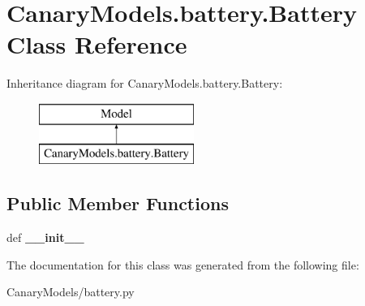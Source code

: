 \hypertarget{class_canary_models_1_1battery_1_1_battery}{\section{Canary\-Models.\-battery.\-Battery Class Reference}
\label{class_canary_models_1_1battery_1_1_battery}
}
Inheritance diagram for Canary\-Models.\-battery.\-Battery\-:\begin{figure}[H]
\begin{center}
\leavevmode
\includegraphics[height=2.000000cm]{class_canary_models_1_1battery_1_1_battery}
\end{center}
\end{figure}
\subsection*{Public Member Functions}
\begin{DoxyCompactItemize}
\item 
\hypertarget{class_canary_models_1_1battery_1_1_battery_a6c16d21f84b24adf291383af45f24b54}{def {\bfseries \-\_\-\-\_\-init\-\_\-\-\_\-}}\label{class_canary_models_1_1battery_1_1_battery_a6c16d21f84b24adf291383af45f24b54}

\end{DoxyCompactItemize}


The documentation for this class was generated from the following file\-:\begin{DoxyCompactItemize}
\item 
Canary\-Models/battery.\-py\end{DoxyCompactItemize}
